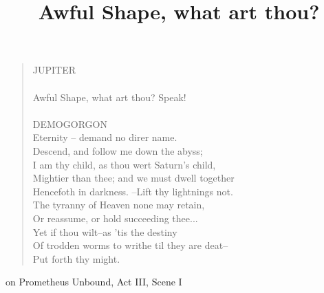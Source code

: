 \documentclass[12pt]{article}
\title{Awful Shape, what art thou?}
\begin{document}
\begin{verse}
  JUPITER \\
  [...] \\
  Awful Shape, what art thou? Speak! \\
  \\
  DEMOGORGON \\
  Eternity -- demand no direr name. \\
  Descend, and follow me down the abyss; \\
  I am thy child, as thou wert Saturn's child, \\
  Mightier than thee; and we must dwell together \\
  Hencefoth in darkness. --Lift thy lightnings not. \\
  The tyranny of Heaven none may retain, \\
  Or reassume, or hold succeeding thee... \\
  Yet if thou wilt--as 'tis the destiny \\
  Of trodden worms to writhe til they are deat-- \\
  Put forth thy might.
\end{verse}

on Prometheus Unbound, Act III, Scene I \nocite{shelley2002shelley}
\end{document}
